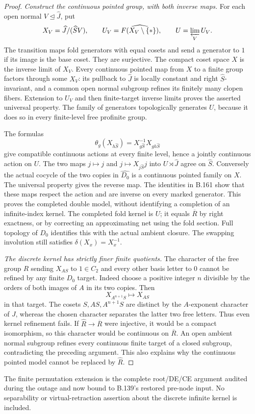 \begin{proof}
\emph{Construct the continuous pointed group, with both inverse maps.}
For each open normal $V\trianglelefteq\widehat J$, put
\[
 X_V=\widehat J/(\widehat S V),\qquad
 U_V=\widehat{F(X_V\setminus\{*\})},\qquad U=\varprojlim_V U_V.
\]
The transition maps fold generators with equal cosets and send a
generator to $1$ if its image is the base coset. They are surjective.
The compact coset space $X$ is the inverse limit of $X_V$.
Every continuous pointed map from $X$ to a finite group factors
through some $X_V$: its pullback to $\widehat J$ is locally constant
and right $\widehat S$-invariant, and a common open normal subgroup
refines its finitely many clopen fibers. Extension to $U_V$ and then
finite-target inverse limits proves the asserted universal property.
The family of generators topologically generates $U$, because it
does so in every finite-level free profinite group.

The formulas
\[
 \theta_g(X_{h\widehat S})=X_{g\widehat S}^{-1}X_{gh\widehat S}
\]
give compatible continuous actions at every finite level, hence a
jointly continuous action on $U$. The two maps
$j\mapsto j$ and $j\mapsto X_{j\widehat S}j$ into
$U\rtimes\widehat J$ agree on $\widehat S$. Conversely the actual
cocycle of the two copies in $\widehat{D_0}$ is a continuous pointed
family on $X$. The universal property gives the reverse map. The
identities in B.161 show that these maps respect the action and are
inverse on every marked generator. This proves the completed double
model, without identifying a completion of an infinite-index kernel.
The completed fold kernel is $U$; it equals $\overline R$ by right
exactness, or by correcting an approximating net using the fold section.
Full topology of $D_0$ identifies this with the actual ambient closure.
The swapping involution still satisfies $\delta(X_x)=X_x^{-1}$.

\emph{The discrete kernel has strictly finer finite quotients.}
The character of the free group $R$ sending $X_{AS}$ to $1\in C_2$
and every other basis letter to $0$ cannot be refined by any finite
$D_0$ target. Indeed choose a positive integer $n$ divisible by the
orders of both images of $A$ in its two copies. Then
\[
 X_{A^{n+1}S}\longmapsto X_{AS}
\]
in that target. The cosets $S,AS,A^{n+1}S$ are distinct by the
$A$-exponent character of $J$, whereas the chosen character separates
the latter two free letters. Thus even kernel refinement fails.
If $\widehat R\to\overline R$ were injective, it would be a compact
isomorphism, so this character would be continuous on $\overline R$.
An open ambient normal subgroup refines every continuous finite target
of a closed subgroup, contradicting the preceding argument. This also
explains why the continuous pointed model cannot be replaced by
$\widehat R$.
\end{proof}
The finite permutation extension is the complete root/DE/CE argument
audited during the outage and now bound to B.139's restored pre-node input.
No separability or virtual-retraction assertion about the discrete
infinite kernel is included.
